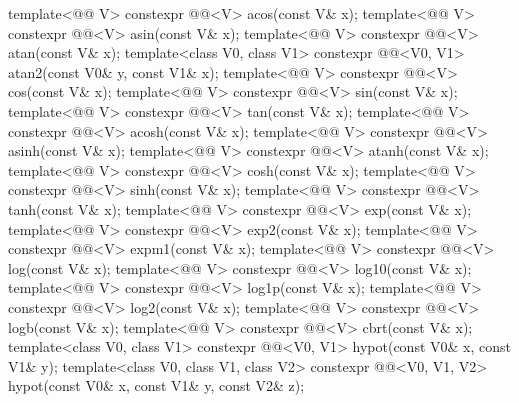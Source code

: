 \begin{itemdecl}
template<@@ V> constexpr @@<V> acos(const V& x);
template<@@ V> constexpr @@<V> asin(const V& x);
template<@@ V> constexpr @@<V> atan(const V& x);
template<class V0, class V1>
  constexpr @@<V0, V1> atan2(const V0& y, const V1& x);
template<@@ V> constexpr @@<V> cos(const V& x);
template<@@ V> constexpr @@<V> sin(const V& x);
template<@@ V> constexpr @@<V> tan(const V& x);
template<@@ V> constexpr @@<V> acosh(const V& x);
template<@@ V> constexpr @@<V> asinh(const V& x);
template<@@ V> constexpr @@<V> atanh(const V& x);
template<@@ V> constexpr @@<V> cosh(const V& x);
template<@@ V> constexpr @@<V> sinh(const V& x);
template<@@ V> constexpr @@<V> tanh(const V& x);
template<@@ V> constexpr @@<V> exp(const V& x);
template<@@ V> constexpr @@<V> exp2(const V& x);
template<@@ V> constexpr @@<V> expm1(const V& x);
template<@@ V> constexpr @@<V> log(const V& x);
template<@@ V> constexpr @@<V> log10(const V& x);
template<@@ V> constexpr @@<V> log1p(const V& x);
template<@@ V> constexpr @@<V> log2(const V& x);
template<@@ V> constexpr @@<V> logb(const V& x);
template<@@ V> constexpr @@<V> cbrt(const V& x);
template<class V0, class V1>
  constexpr @@<V0, V1> hypot(const V0& x, const V1& y);
template<class V0, class V1, class V2>
  constexpr @@<V0, V1, V2> hypot(const V0& x, const V1& y, const V2& z);

\end{itemdecl}
